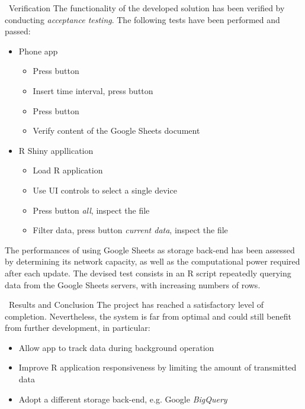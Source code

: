 \documentclass[final]{beamer}
\newlength{\onecolwid}
\begin{document}
\begin{frame}[t]
\begin{columns}[t]
\begin{column}{\onecolwid}
	\begin{block}{\faCheckCircle \, Verification}
		The functionality of the developed solution has been verified by conducting \emph{acceptance testing}.
		The following tests have been performed and passed:
		\begin{itemize}
			\item Phone app
			\begin{itemize}
				\item Press button {\scriptsize\faPlay}
				\item Insert time interval, press button {\scriptsize\faPlay}
				\item Press button {\scriptsize\faPause}
				\item Verify content of the Google Sheets document
			\end{itemize}
			\item R Shiny appllication
			\begin{itemize}
				\item Load R application
				\item Use UI controls to select a single device
				\item Press button {\scriptsize\faDownload} \emph{all}, inspect the file
				\item Filter data, press button {\scriptsize\faDownload} \emph{current data}, inspect the file
			\end{itemize}
		\end{itemize}

		\vspace{.3in}
		The performances of using Google Sheets as storage back-end has been assessed by determining its network capacity, as well as the computational power required after each update.
		The devised test consists in an R script repeatedly querying data from the Google Sheets servers, with increasing numbers of rows.
	\end{block}

	\begin{block}{\faPieChart \, Results and Conclusion}
		The project has reached a satisfactory level of completion.
		Nevertheless, the system is far from optimal and could still benefit from further development, in particular:
		\begin{itemize}
			\item Allow app to track data during background operation
			\item Improve R application responsiveness by limiting the amount of transmitted data
			\item Adopt a different storage back-end, e.g. Google \emph{BigQuery}
		\end{itemize}


\end{block}
\end{column}
\end{columns}
\end{frame}
\end{document}
